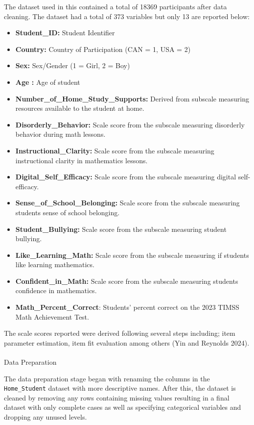 \documentclass[
  letterpaper,
  DIV=11,
  numbers=noendperiod]{scrartcl}
\makeatletter
\let\oldparagraph\paragraph
\renewcommand{\paragraph}{
    \@ifstar
      \xxxParagraphStar
      \xxxParagraphNoStar
  }
\newcommand{\xxxParagraphStar}[1]{\oldparagraph*{#1}\mbox{}}
\newcommand{\xxxParagraphNoStar}[1]{\oldparagraph{#1}\mbox{}}
\makeatother
\begin{document}
The dataset used in this contained a total of 18369 participants after
data cleaning. The dataset had a total of 373 variables but only 13 are
reported below:

\begin{itemize}
\item
  \textbf{Student\_ID:} Student Identifier
\item
  \textbf{Country:} Country of Participation (CAN = 1, USA = 2)
\item
  \textbf{Sex:} Sex/Gender (1 = Girl, 2 = Boy)
\item
  \textbf{Age :} Age of student
\item
  \textbf{Number\_of\_Home\_Study\_Supports:} Derived from subscale
  measuring resources available to the student at home.
\item
  \textbf{Disorderly\_Behavior:} Scale score from the subscale measuring
  disorderly behavior during math lessons.
\item
  \textbf{Instructional\_Clarity:} Scale score from the subscale
  measuring instructional clarity in mathematics lessons.
\item
  \textbf{Digital\_Self\_Efficacy:} Scale score from the subscale
  measuring digital self-efficacy.
\item
  \textbf{Sense\_of\_School\_Belonging:} Scale score from the subscale
  measuring students sense of school belonging.
\item
  \textbf{Student\_Bullying:} Scale score from the subscale measuring
  student bullying.
\item
  \textbf{Like\_Learning\_Math:} Scale score from the subscale measuring
  if students like learning mathematics.
\item
  \textbf{Confident\_in\_Math:} Scale score from the subscale measuring
  students confidence in mathematics.
\item
  \textbf{Math\_Percent\_Correct}: Students' percent correct on the 2023
  TIMSS Math Achievement Test.
\end{itemize}

The scale scores reported were derived following several steps
including; item parameter estimation, item fit evaluation among others
(Yin and Reynolds 2024).

\paragraph{Data Preparation}\label{data-preparation}

The data preparation stage began with renaming the columns in the
\texttt{Home\_Student} dataset with more descriptive names. After this,
the dataset is cleaned by removing any rows containing missing values
resulting in a final dataset with only complete cases as well as
specifying categorical variables and dropping any unused levels.
\end{document}
